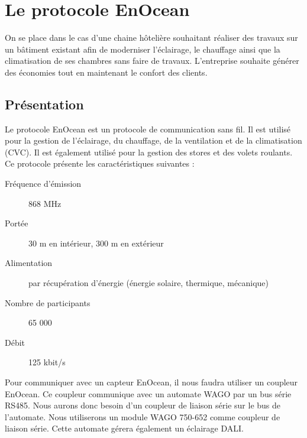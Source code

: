 \section{Le protocole EnOcean}

On se place dans le cas d'une chaine hôtelière souhaitant réaliser des travaux sur un bâtiment existant afin de moderniser l'éclairage, le chauffage ainsi que la climatisation de ses chambres sans faire de travaux. L'entreprise souhaite générer des économies tout en maintenant le confort des clients.


\subsection{Présentation}
Le protocole EnOcean est un protocole de communication sans fil. Il est utilisé pour la gestion de l'éclairage, du chauffage, de la ventilation et de la climatisation (CVC). Il est également utilisé pour la gestion des stores et des volets roulants.
Ce protocole présente les caractéristiques suivantes : 
\begin{description}
    \item[Fréquence d'émission] 868 MHz
    \item[Portée] 30 m en intérieur, 300 m en extérieur
    \item[Alimentation] par récupération d'énergie (énergie solaire, thermique, mécanique)
    \item[Nombre de participants] 65 000
    \item[Débit] 125 kbit/s 
\end{description}

Pour communiquer avec un capteur EnOcean, il nous faudra utiliser un coupleur EnOcean.  Ce coupleur communique avec un automate WAGO par un bus série RS485. Nous aurons donc besoin d'un coupleur de liaison série sur le bus de l'automate. Nous utiliserons un module WAGO 750-652 comme coupleur de liaison série.
Cette automate gérera également un éclairage DALI. 



